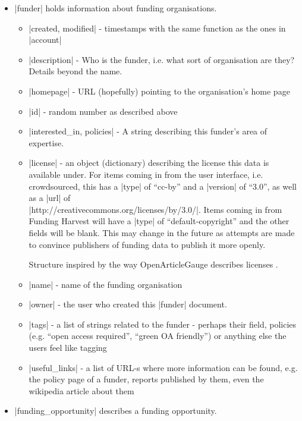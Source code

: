 \begin{itemize}
\item |funder| holds information about funding organisations.
	\begin{itemize}
    \item |created, modified| - timestamps with the same function as the ones in |account|
    \item |description| - Who is the funder, i.e. what sort of organisation are they? Details beyond the name.
    \item |homepage| - URL (hopefully) pointing to the organisation's home page
    \item |id| - random number as described above
    \item |interested_in, policies| - A string describing this funder's area of expertise.
	\item |license| - an object (dictionary) describing the license this data is available under. For items coming in from the user interface, i.e. crowdsourced, this has a |type| of ``cc-by'' and a |version| of ``3.0'', as well as a |url| of
	\\ |http://creativecommons.org/licenses/by/3.0/|. Items coming in from Funding Harvest will have a |type| of ``default-copyright'' and the other fields will be blank. This may change in the future as attempts are made to convince publishers of funding data to publish it more openly.
	
	Structure inspired by the way OpenArticleGauge describes licenses \cite{oag-api}.
    \item |name| - name of the funding organisation
    \item |owner| - the user who created this |funder| document.
    \item |tags| - a list of strings related to the funder - perhaps their field, policies (e.g. ``open access required'', ``green OA friendly'') or anything else the users feel like tagging
    \item |useful_links| - a list of URL-s where more information can be found, e.g. the policy page of a funder, reports published by them, even the wikipedia article about them
    \end{itemize}
    
\item |funding_opportunity| describes a funding opportunity.


\end{itemize}
